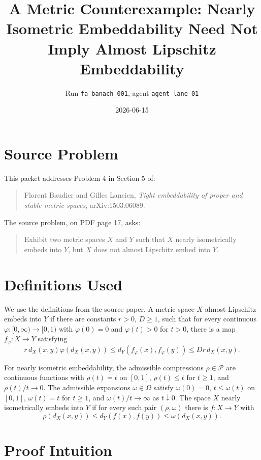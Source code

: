 \documentclass[11pt]{article}
\title{A Metric Counterexample: Nearly Isometric Embeddability Need Not Imply Almost Lipschitz Embeddability}
\author{Run \texttt{fa\_banach\_001}, agent \texttt{agent\_lane\_01}}
\date{2026-06-15}
\newcommand{\rhoF}{\mathcal P}
\newcommand{\omegaF}{\Omega}
\begin{document}
\maketitle

\section*{Source Problem}

This packet addresses Problem 4 in Section 5 of:

\begin{quote}
Florent Baudier and Gilles Lancien, \emph{Tight embeddability of proper and stable metric spaces}, arXiv:1503.06089.
\end{quote}

The source problem, on PDF page 17, asks:

\begin{quote}
Exhibit two metric spaces \(X\) and \(Y\) such that \(X\) nearly isometrically embeds into \(Y\), but \(X\) does not almost Lipschitz embed into \(Y\).
\end{quote}

\section*{Definitions Used}

We use the definitions from the source paper.  A metric space \(X\) almost
Lipschitz embeds into \(Y\) if there are constants \(r>0\), \(D\ge 1\), such
that for every continuous \(\varphi:[0,\infty)\to[0,1)\) with
\(\varphi(0)=0\) and \(\varphi(t)>0\) for \(t>0\), there is a map
\(f_\varphi:X\to Y\) satisfying
\[
 r\,d_X(x,y)\varphi(d_X(x,y))
 \le d_Y(f_\varphi(x),f_\varphi(y))
 \le D r\, d_X(x,y).
\]

For nearly isometric embeddability, the admissible compressions \(\rho\in\rhoF\)
are continuous functions with \(\rho(t)=t\) on \([0,1]\),
\(\rho(t)\le t\) for \(t\ge 1\), and \(\rho(t)/t\to0\).  The admissible
expansions \(\omega\in\omegaF\) satisfy \(\omega(0)=0\), \(t\le\omega(t)\) on
\([0,1]\), \(\omega(t)=t\) for \(t\ge1\), and \(\omega(t)/t\to\infty\) as
\(t\downarrow0\).  The space \(X\) nearly isometrically embeds into \(Y\) if
for every such pair \((\rho,\omega)\) there is \(f:X\to Y\) with
\[
\rho(d_X(x,y))\le d_Y(f(x),f(y))\le \omega(d_X(x,y)).
\]

\section*{Proof Intuition}
\end{document}
